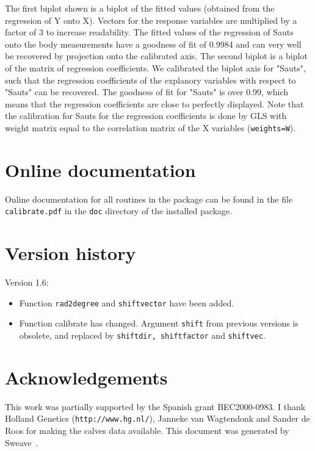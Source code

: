 \documentclass[a4paper]{article}
\begin{document}
The first biplot shown is a biplot of the fitted values (obtained 
from the regression of Y onto X). Vectors for the response variables are multiplied by a factor of 3 to increase
readability. The fitted values of the regression of Sauts onto the body measurements have
a goodness of fit of 0.9984 and can very well be recovered by projection onto the calibrated
axis. The second biplot is a biplot of the matrix of regression coefficients. We
calibrated the biplot axis for "Sauts", such that the regression coefficients of the
explanory variables with respect to "Sauts" can be recovered. The goodness of fit for
"Sauts" is over 0.99, which means that the regression coefficients are close to
perfectly displayed. Note that the calibration for Sauts for the regression coefficients
is done by GLS with weight matrix equal to the correlation matrix of the X variables
({\tt weights=W}).

\section{Online documentation}
\label{sec:online}

Online documentation for all routines in the package can be found in the file
{\tt calibrate.pdf} in the {\tt doc} directory of the installed package.

\section{Version history}

Version 1.6:\\

\begin{itemize}

\item Function {\tt rad2degree} and {\tt shiftvector} have been added.

\item Function calibrate has changed. Argument {\tt shift} from previous versions is obsolete,
  and replaced by {\tt shiftdir, shiftfactor} and {\tt shiftvec}.

\end{itemize}

\section*{Acknowledgements}

This work was partially supported by the Spanish grant BEC2000-0983. I thank Holland Genetics 
({\tt http://www.hg.nl/}), Janneke van Wagtendonk and Sander de Roos for making the calves data 
available. This document was generated by Sweave~\cite{Leisch}.
\end{document}
